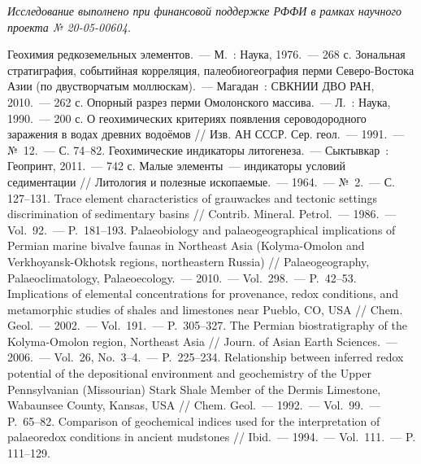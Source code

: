 \textit{Исследование выполнено при финансовой поддержке РФФИ в рамках научного проекта № 20-05-00604.}


\begin{thebibliography}{99}
\bibitem{} Геохимия редкоземельных элементов.~--- М.~: Наука, 1976.~--- 268 с.
\bibitem{} Зональная стратиграфия, событийная корреляция, палеобиогеография перми Северо-Востока Азии (по двустворчатым моллюскам).~--- Магадан~: СВКНИИ ДВО РАН, 2010.~--- 262 с.
\bibitem{} Опорный разрез перми Омолонского массива.~--- Л.~: Наука, 1990.~--- 200 с.
\bibitem{} О геохимических критериях появления сероводородного заражения в водах древних водоёмов // Изв. АН СССР. Сер. геол.~--- 1991.~--- №~12.~--- С. 74--82.
\bibitem{} Геохимические индикаторы литогенеза.~--- Сыктывкар~: Геопринт, 2011.~--- 742 с.
\bibitem{} Малые элементы~--- индикаторы условий седиментации // Литология и полезные ископаемые.~--- 1964.~--- №~2.~--- С. 127--131.
\bibitem{} Trace element characteristics of grauwackes and tectonic settings discrimination of sedimentary basins // Contrib. Mineral. Petrol.~--- 1986.~--- Vol.~92.~--- P.~181--193.
\bibitem{} Palaeobiology and palaeogeographical implications of Permian marine bivalve faunas in Northeast Asia (Kolyma-Omolon and Verkhoyansk-Okhotsk regions, northeastern Russia) // Palaeogeography, Palaeoclimatology, Palaeoecology.~--- 2010.~--- Vol.~298.~--- P.~42--53.
\bibitem{} Implications of elemental concentrations for provenance, redox conditions, and metamorphic studies of shales and limestones near Pueblo, CO, USA // Chem. Geol.~--- 2002.~--- Vol.~191.~--- P.~305--327.
\bibitem{} The Permian biostratigraphy of the Kolyma-Omolon region, Northeast Asia // Journ. of Asian Earth Sciences.~--- 2006.~--- Vol.~26, No.~3--4.~--- P.~225--234.
\bibitem{} Relationship between inferred redox potential of the depositional environment and geochemistry of the Upper Pennsylvanian (Missourian) Stark Shale Member of the Dermis Limestone, Wabaunsee County, Kansas, USA // Chem. Geol.~--- 1992.~--- Vol.~99.~--- P.~65--82.
\bibitem{} Comparison of geochemical indices used for the interpretation of palaeoredox conditions in ancient mudstones // Ibid.~--- 1994.~--- Vol.~111.~--- P. 111--129.

\end{thebibliography}
